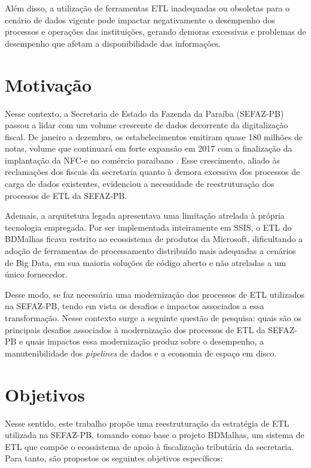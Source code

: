 Além disso, a utilização de ferramentas ETL inadequadas ou obsoletas para o cenário de dados vigente pode 
impactar negativamente o desempenho dos processos e operações das instituições, gerando demoras excessivas 
e problemas de desempenho que afetam a disponibilidade das informações. 

\section{Motivação}

Nesse contexto, a Secretaria de Estado da Fazenda da Paraíba (SEFAZ-PB) passou a lidar com 
um volume crescente de dados decorrente da digitalização fiscal. De janeiro a dezembro, 
os estabelecimentos emitiram quase 180 milhões de notas, volume que continuará em forte
expansão em 2017 com a finalização da implantação da NFC-e no comércio paraibano \cite{sefaz-pb_crecente_v_nfce}. 
Esse crescimento, aliado às reclamações dos fiscais da secretaria quanto à demora excessiva dos
processos de carga de dados existentes, evidenciou a necessidade de reestruturação dos processos de
ETL da SEFAZ-PB.

Ademais, a arquitetura legada apresentava uma limitação atrelada à própria tecnologia empregada.
Por ser implementada inteiramente em SSIS, o ETL do BDMalhas ficava restrito ao ecossistema de
produtos da Microsoft, dificultando a adoção de ferramentas de processamento distribuído mais
adequadas a cenários de Big Data, em sua maioria soluções de código aberto e não atreladas a um
único fornecedor.

Desse modo, se faz necessária uma modernização dos processos de ETL utilizados na SEFAZ-PB,
tendo em vista os desafios e impactos associados a essa transformação. Nesse contexto surge 
a seguinte questão de pesquisa: quais são os principais desafios associados à modernização 
dos processos de ETL da SEFAZ-PB e quais impactos essa modernização produz sobre o desempenho,
a manutenibilidade dos \textit{pipelines} de dados e a economia de espaço em disco.

\section{Objetivos}

Nesse sentido, este trabalho propõe uma reestruturação da estratégia de ETL utilizada na 
SEFAZ-PB, tomando como base o projeto BDMalhas, um sistema de ETL que compõe o ecossistema 
de apoio à fiscalização tributária da secretaria. Para tanto, são propostos os seguintes objetivos 
específicos:

